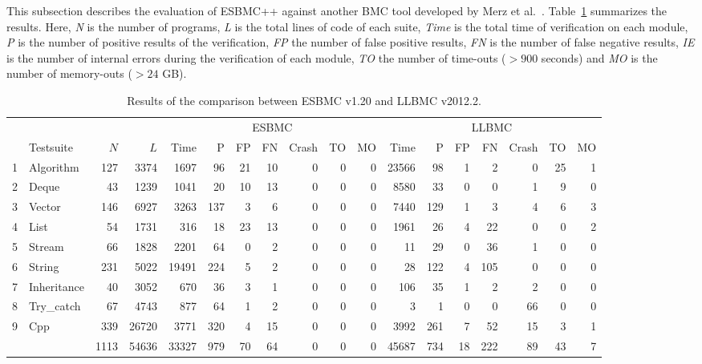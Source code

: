 \documentclass[a4paper]{llncs}
\begin{document}
This subsection describes the evaluation of ESBMC++ against another BMC tool developed by Merz et al.~\cite{Florian12}. Table~\ref{table:results-of-the-comparison-between-ESBMC-and-LLBMC} summarizes the results. Here, \textit{N} is the number of programs,  \textit{L} is the total lines of code of each suite, \textit{Time} is the total time of verification on each module, \textit{P} is the number of positive results of the verification, \textit{FP} the number of false positive results, \textit{FN} is the number of false negative results, \textit{IE} is the number of internal errors during the verification of each module, \textit{TO} the number of time-outs ($>900$ seconds) and \textit{MO} is the number of memory-outs ($>24$ GB).

\begin{table}[t]
\renewcommand\arraystretch{1.18}
\setlength{\tabcolsep}{4pt}
\begin{center} {\small
\begin{tabular}{|c|l|r|r||r|r|r|r|r|r|r|r|r|r|r|r|r|r|}
\hline
  & & & & \multicolumn{7}{c|}{ESBMC} & \multicolumn{7}{c|}{LLBMC} \\  \cline{5-18}
  & Testsuite & $N$ & $L$ & Time & P   & FP  & FN  & Crash & TO  & MO & Time & P   & FP  & FN  & Crash & TO  & MO \\\hline
1 & Algorithm & 127 & 3374 & 1697 & 96 & 21 & 10 & 0 & 0 & 0 & 23566 & 98 & 1 & 2 & 0 & 25 & 1\\ %
\hline
2 & Deque & 43 & 1239 & 1041 & 20 & 10 & 13 & 0 & 0 & 0 & 8580 & 33 & 0 & 0 & 1 & 9 & 0\\ %
\hline
3 & Vector & 146 & 6927 & 3263 & 137 & 3 & 6 & 0 & 0 & 0 & 7440 & 129 & 1 & 3 & 4 & 6 & 3\\ %
\hline
4 & List & 54 & 1731 & 316 & 18 & 23 & 13 & 0 & 0 & 0 & 1961 & 26 & 4 & 22 & 0 & 0 & 2\\ %
\hline
5 & Stream & 66 & 1828 & 2201 & 64 & 0 & 2 & 0 & 0 & 0 & 11 & 29 & 0 & 36 & 1 & 0 & 0\\ %
\hline
6 & String & 231 & 5022 & 19491 & 224& 5 & 2 & 0 & 0 & 0 & 28 & 122 & 4 & 105 & 0 & 0 & 0\\ %
\hline
7 & Inheritance & 40 & 3052 & 670 & 36 & 3 & 1 & 0 & 0 & 0 & 106 & 35 & 1 & 2 & 2 & 0 & 0\\ %
\hline
8 & Try\_catch & 67 & 4743 & 877 & 64 & 1 & 2 & 0 & 0 & 0 & 3 & 1 & 0 & 0 & 66 & 0 & 0 \\ %
\hline
9 & Cpp & 339 & 26720 & 3771 & 320 & 4 & 15 & 0 & 0 & 0 & 3992 & 261 & 7 & 52 & 15 & 3 & 1\\ %
\hline\hline
  &     &  1113 & 54636 & 33327 & 979 & 70 & 64 & 0 & 0 & 0 & 45687 & 734 & 18 & 222 & 89 & 43 & 7\\
\hline
\end{tabular} }
\end{center}
\caption{Results of the comparison between ESBMC v1.20 and LLBMC v2012.2.}
\label{table:results-of-the-comparison-between-ESBMC-and-LLBMC}
\end{table}
\end{document}
